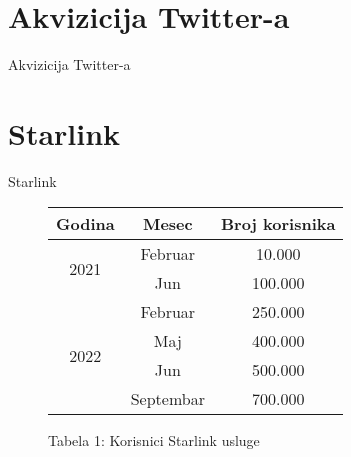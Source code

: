 \documentclass[14pt, aspectratio=169]{beamer}
\begin{document}
\section{Akvizicija Twitter-a}

\begin{frame}{Akvizicija Twitter-a}
\transdissolve
\begin{itemize}
\transboxin
\end{itemize}
\end{frame}

\section{Starlink}
\begin{frame}{Starlink}
\transblindshorizontal
\begin{itemize}
\transboxin
\end{itemize}
\end{frame}

\begin{frame}
\begin{center}
\begin{figure}
\caption{Tabela 1: Korisnici Starlink usluge}
\begin{tabular}{||c|c|c||}
\hline
Godina & Mesec & Broj korisnika \\
\hline
\multirow{2}{*}{2021} & Februar & 10.000 \\
& Jun & 100.000 \\
\hline
\multirow{4}{*}{2022} & Februar & 250.000 \\
& Maj & 400.000 \\
& Jun & 500.000 \\
& Septembar & 700.000 \\
\hline
\end{tabular}
\label{fig:Tabela}
\end{figure}
\end{center}
\end{frame}
\end{document}
